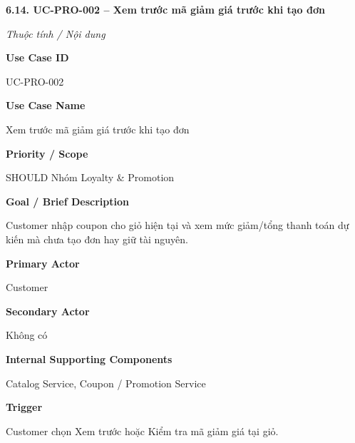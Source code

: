 \documentclass[11pt,a4paper,oneside]{report}
\begin{document}


\textbf{6.14. UC-PRO-002 -- Xem trước mã giảm giá trước khi tạo đơn}



\par\noindent\textit{Thuộc tính / Nội dung}\par

\par\smallskip\noindent\textcolor{sgublue}{\textbf{Use Case ID}}\par\nobreak
UC-PRO-002
\par

\par\smallskip\noindent\textcolor{sgublue}{\textbf{Use Case Name}}\par\nobreak
Xem trước mã giảm giá trước khi tạo đơn
\par

\par\smallskip\noindent\textcolor{sgublue}{\textbf{Priority / Scope}}\par\nobreak
SHOULD \textbar{} Nhóm Loyalty \& Promotion
\par

\par\smallskip\noindent\textcolor{sgublue}{\textbf{Goal / Brief Description}}\par\nobreak
Customer nhập coupon cho giỏ hiện tại và xem mức giảm/tổng thanh toán dự kiến mà chưa tạo đơn hay giữ tài nguyên.
\par

\par\smallskip\noindent\textcolor{sgublue}{\textbf{Primary Actor}}\par\nobreak
Customer
\par

\par\smallskip\noindent\textcolor{sgublue}{\textbf{Secondary Actor}}\par\nobreak
Không có
\par

\par\smallskip\noindent\textcolor{sgublue}{\textbf{Internal Supporting Components}}\par\nobreak
Catalog Service, Coupon / Promotion Service
\par

\par\smallskip\noindent\textcolor{sgublue}{\textbf{Trigger}}\par\nobreak
Customer chọn Xem trước hoặc Kiểm tra mã giảm giá tại giỏ.
\par
\end{document}
